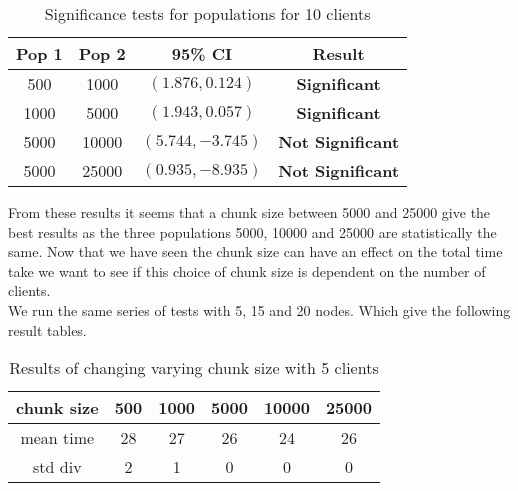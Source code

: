 \documentclass[a4paper, 12pt]{article}
\begin{document}
			\begin{table}[H]
				\begin{center}
					\begin{tabular}{| c | c | c | c |}
						\hline
						Pop 1 & Pop 2 & 95\% CI & Result\\
						\hline
						500 & 1000 & $(1.876, 0.124)$ & \textbf{Significant}\\
						1000 & 5000 & $(1.943, 0.057)$ & \textbf{Significant} \\
						5000 & 10000 & $(5.744, -3.745)$ & \textbf{Not Significant} \\
						5000 & 25000 & $(0.935, -8.935)$ & \textbf{Not Significant} \\
					
						\hline
					\end{tabular}
					
					\caption{Significance tests for populations for 10 clients}					
					
				\end{center}
			\end{table}						
			
			From these results it seems that a chunk size between 5000 and 25000 give the best results as the three populations 5000, 10000 and 25000 are statistically the same. Now that we have seen the chunk size can have an effect on the total time take we want to see if this choice of chunk size is dependent on the number of clients.\\
			
			We run the same series of tests with 5, 15 and 20 nodes. Which give the following result tables.
			
			\begin{table}[H]
				\begin{center}
					\begin{tabular}{ | c c c c c c |}
					\hline
					chunk size & 500 & 1000 & 5000 & 10000 & 25000\\
					\hline
					\hline
					mean time & 28 & 27 & 26 & 24 & 26\\
					std div & 2 & 1 & 0 & 0 & 0\\
					\hline
			
					\end{tabular}
					
					\caption{Results of changing varying chunk size with 5 clients}					
					
				\end{center}
			\end{table}			
			
\end{document}
